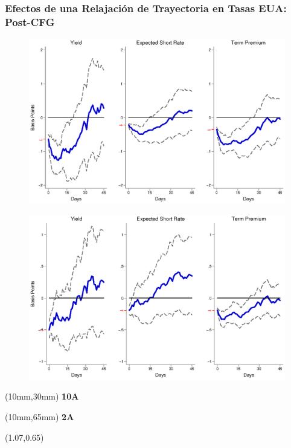 \documentclass[12pt, aspectratio=169, xcolor=dvipsnames]{beamer}
\begin{document}
\begin{frame}[label=FGUSpost]
\frametitle{Efectos de una Relajación de Trayectoria en Tasas EUA: Post-CFG}
\begin{figure}[!htbp]
\begin{center} %
\includegraphics[trim={0cm 0cm 0cm 0cm},clip,height=0.45\textheight,width=0.85\linewidth]{../Figures/LPs/LagDep-FX/Path/US/PathUSDnomyptp120mPost.eps}
\par\end{center}
\end{figure}
\vspace{-0.5cm}
\begin{figure}[!htbp]
\begin{center} %
\includegraphics[trim={0cm 0cm 0cm 0.76cm},clip,height=0.45\textheight,width=0.85\linewidth]{../Figures/LPs/LagDep-FX/Path/US/PathUSDnomyptp24mPost.eps}
\par\end{center}
\end{figure}
\begin{textblock*}{8mm}(10mm,30mm)
\small \textbf{10A}
\end{textblock*}
\begin{textblock*}{8mm}(10mm,65mm)
\small \textbf{2A}
\end{textblock*}
\begin{textblock*}{5cm}(1.07\textwidth,0.65\textheight)
\hyperlink{FGEMpost}{}
\end{textblock*}
\end{frame}
\end{document}
